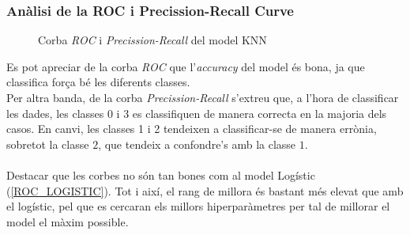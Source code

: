 \documentclass[a4paper, 11pt]{article}
\begin{document}
\subsubsection{Anàlisi de la ROC i Precission-Recall Curve} \label{ROC_KNN}
\begin{figure}[h]
\centering
    \caption{Corba \textit{ROC} i \textit{Precission-Recall} del model KNN}
    \label{fig:my_label}
\end{figure}
\hspace{-1.6em}Es pot apreciar de la corba \textit{ROC} que l'\textit{accuracy} del model és bona, ja que classifica força bé les diferents classes. \\
Per altra banda, de la corba \textit{Precission-Recall} s'extreu que, a l'hora de classificar les dades, les classes 0 i 3 es classifiquen de manera correcta en la majoria dels casos. En canvi, les classes 1 i 2 tendeixen a classificar-se de manera errònia, sobretot la classe $2$, que tendeix a confondre's amb la classe $1$.\\\\
Destacar que les corbes no són tan bones com al model Logístic (\textcolor{blue}{\ref{ROC_LOGISTIC}}). Tot i així, el rang de millora és bastant més elevat que amb el logístic, pel que es cercaran els millors hiperparàmetres per tal de millorar el model el màxim possible. 
\newpage
\end{document}
